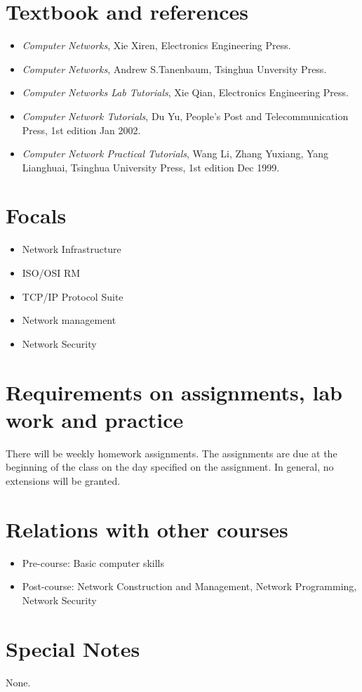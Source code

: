 \documentclass{wx672article}
\begin{document}
\section*{Textbook and references}
\label{sec-7}

\begin{itemize}
\item \emph{Computer Networks}, Xie Xiren, Electronics Engineering Press.
\item \emph{Computer Networks}, Andrew S.Tanenbaum, Tsinghua Unversity Press.
\item \emph{Computer Networks Lab Tutorials}, Xie Qian, Electronics Engineering Press.
\item \emph{Computer Network Tutorials}, Du Yu, People's Post and
     Telecommunication Press, 1st edition Jan 2002.
\item \emph{Computer Network Practical Tutorials}, Wang Li, Zhang Yuxiang,
     Yang Lianghuai, Tsinghua University Press, 1st edition Dec 1999.
\end{itemize}
\section*{Focals}
\label{sec-8}

\begin{itemize}
\item Network Infrastructure
\item ISO/OSI RM
\item TCP/IP Protocol Suite
\item Network management
\item Network Security
\end{itemize}
\section*{Requirements on assignments, lab work and practice}
\label{sec-9}

   There will be weekly homework assignments. The assignments are due at the beginning of
   the class on the day specified on the assignment. In general, no extensions will be
   granted.
   
\section*{Relations with other courses}
\label{sec-10}

\begin{itemize}
\item Pre-course: Basic computer skills
\item Post-course: Network Construction and Management, Network Programming, Network Security
\end{itemize}
\section*{Special Notes}
\label{sec-11}

   None.
   
\end{document}
